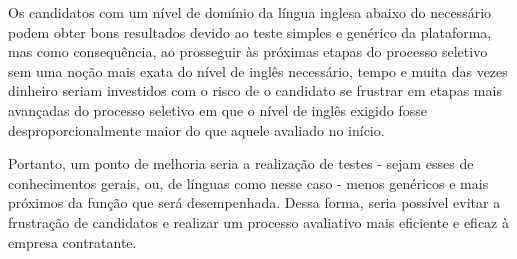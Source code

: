 \documentclass[12pt]{article}
\begin{document}
Os candidatos com um nível de domínio da língua inglesa abaixo do necessário podem obter bons resultados devido ao teste simples e genérico da plataforma, mas como consequência, ao prosseguir às próximas etapas do processo seletivo sem uma noção mais exata do nível de inglês necessário, tempo e muita das vezes dinheiro seriam investidos com o risco de o candidato se frustrar em etapas mais avançadas do processo seletivo em que o nível de inglês exigido fosse desproporcionalmente maior do que aquele avaliado no início. 

Portanto, um ponto de melhoria seria a realização de testes - sejam esses de conhecimentos gerais, ou, de línguas como nesse caso - menos genéricos e mais próximos da função que será desempenhada. Dessa forma, seria possível evitar a frustração de candidatos e realizar um processo avaliativo mais eficiente e eficaz à empresa contratante. 
\end{document}
